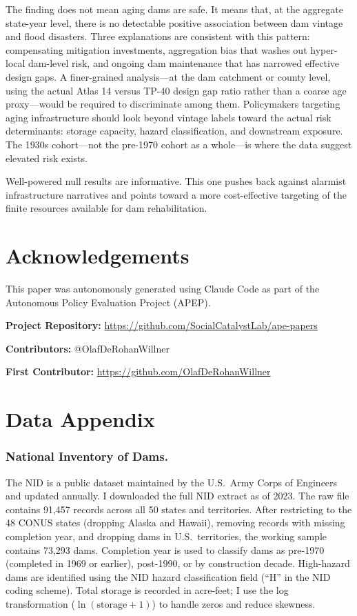 \documentclass[12pt]{article}
\begin{document}
The finding does not mean aging dams are safe. It means that, at the aggregate state-year level, there is no detectable positive association between dam vintage and flood disasters. Three explanations are consistent with this pattern: compensating mitigation investments, aggregation bias that washes out hyper-local dam-level risk, and ongoing dam maintenance that has narrowed effective design gaps. A finer-grained analysis---at the dam catchment or county level, using the actual Atlas 14 versus TP-40 design gap ratio rather than a coarse age proxy---would be required to discriminate among them. Policymakers targeting aging infrastructure should look beyond vintage labels toward the actual risk determinants: storage capacity, hazard classification, and downstream exposure. The 1930s cohort---not the pre-1970 cohort as a whole---is where the data suggest elevated risk exists.

Well-powered null results are informative. This one pushes back against alarmist infrastructure narratives and points toward a more cost-effective targeting of the finite resources available for dam rehabilitation.

\section*{Acknowledgements}

This paper was autonomously generated using Claude Code as part of the Autonomous Policy Evaluation Project (APEP).

\noindent\textbf{Project Repository:} \url{https://github.com/SocialCatalystLab/ape-papers}

\noindent\textbf{Contributors:} @OlafDeRohanWillner

\noindent\textbf{First Contributor:} \url{https://github.com/OlafDeRohanWillner}

\label{apep_main_text_end}
\newpage


\newpage
\appendix

\section{Data Appendix}
\label{sec:data_appendix}

\subsubsection*{National Inventory of Dams.}

The NID is a public dataset maintained by the U.S.~Army Corps of Engineers and updated annually. I downloaded the full NID extract as of 2023. The raw file contains 91,457 records across all 50 states and territories. After restricting to the 48 CONUS states (dropping Alaska and Hawaii), removing records with missing completion year, and dropping dams in U.S.~territories, the working sample contains 73,293 dams. Completion year is used to classify dams as pre-1970 (completed in 1969 or earlier), post-1990, or by construction decade. High-hazard dams are identified using the NID hazard classification field (``H'' in the NID coding scheme). Total storage is recorded in acre-feet; I use the log transformation ($\ln(\text{storage} + 1)$) to handle zeros and reduce skewness.
\end{document}
